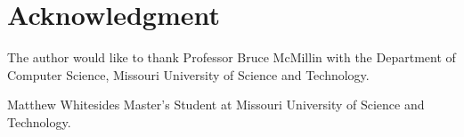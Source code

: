 \documentclass[10pt,journal,compsoc]{IEEEtran}
\begin{document}
\section*{Acknowledgment}
The author would like to thank Professor Bruce McMillin with the Department of Computer Science, Missouri University of Science and Technology.

\begin{IEEEbiographynophoto}{Matthew Whitesides}
  Master's Student at Missouri University of Science and Technology.
\end{IEEEbiographynophoto}

\end{document}
